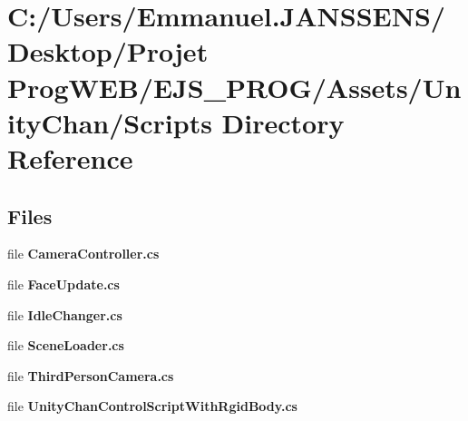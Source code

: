 \section{C\+:/\+Users/\+Emmanuel.J\+A\+N\+S\+S\+E\+N\+S/\+Desktop/\+Projet Prog\+W\+E\+B/\+E\+J\+S\+\_\+\+P\+R\+O\+G/\+Assets/\+Unity\+Chan/\+Scripts Directory Reference}
\label{dir_6c3d6018dee6cc181606746dee1eeb96}
\subsection*{Files}
\begin{DoxyCompactItemize}
\item 
file \textbf{ Camera\+Controller.\+cs}
\item 
file \textbf{ Face\+Update.\+cs}
\item 
file \textbf{ Idle\+Changer.\+cs}
\item 
file \textbf{ Scene\+Loader.\+cs}
\item 
file \textbf{ Third\+Person\+Camera.\+cs}
\item 
file \textbf{ Unity\+Chan\+Control\+Script\+With\+Rgid\+Body.\+cs}
\end{DoxyCompactItemize}
